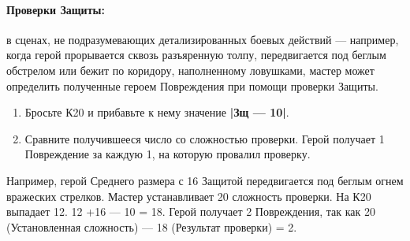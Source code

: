 \paragraph{Проверки Защиты:} в сценах, не подразумевающих
детализированных боевых действий — например, когда герой
прорывается сквозь разъяренную толпу, передвигается под беглым обстрелом или бежит по коридору, наполненному ловушками, мастер может определить полученные героем Повреждения при помощи проверки Защиты.
\begin{enumerate}
\item Бросьте К20 и прибавьте к нему значение \textbf{|Зщ — 10|}.
\item Сравните получившееся число со сложностью проверки. Герой получает 1 Повреждение за каждую 1, на которую провалил проверку.
\end{enumerate}
Например, герой Среднего размера с 16 Защитой передвигается
под беглым огнем вражеских стрелков. Мастер устанавливает
20 сложность проверки. На К20 выпадает 12. 12 +16 — 10 = 18.
Герой получает 2 Повреждения, так как 20 (Установленная
сложность) — 18 (Результат проверки) = 2.